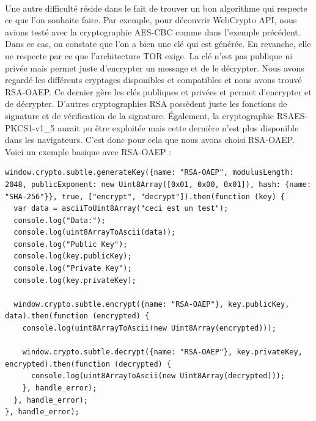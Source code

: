 \documentclass[a4paper,12pt]{report}
\begin{document}
	\paragraph*{}
	Une autre difficulté réside dans le fait de trouver un bon algorithme qui respecte ce que l'on souhaite faire. Par exemple, pour découvrir WebCrypto API, nous avions testé avec la cryptographie AES-CBC comme dans l'exemple précédent.
	Dans ce cas, on constate que l'on a bien une clé qui est générée. En revanche, elle ne respecte par ce que l'architecture TOR exige. La clé n'est pas publique ni privée mais permet juste d'encrypter un message et de le décrypter. Nous avons regardé les différents cryptages disponibles et compatibles et nous avons trouvé RSA-OAEP. Ce dernier gère les clés publiques et privées et permet d'encrypter et de décrypter. D'autres cryptographies RSA possèdent juste les fonctions de signature et de vérification de la signature. Également, la cryptographie RSAES-PKCS1-v1\_5	 aurait pu être exploitée mais cette dernière n'est plus disponible dans les navigateurs. C'est donc pour cela que nous avons choisi RSA-OAEP.\\
	Voici un exemple basique avec RSA-OAEP :
	\begin{lstlisting}
window.crypto.subtle.generateKey({name: "RSA-OAEP", modulusLength: 2048, publicExponent: new Uint8Array([0x01, 0x00, 0x01]), hash: {name: "SHA-256"}}, true, ["encrypt", "decrypt"]).then(function (key) {
  var data = asciiToUint8Array("ceci est un test");
  console.log("Data:");
  console.log(uint8ArrayToAscii(data));
  console.log("Public Key");
  console.log(key.publicKey);
  console.log("Private Key");
  console.log(key.privateKey);

  window.crypto.subtle.encrypt({name: "RSA-OAEP"}, key.publicKey, data).then(function (encrypted) {
    console.log(uint8ArrayToAscii(new Uint8Array(encrypted)));

    window.crypto.subtle.decrypt({name: "RSA-OAEP"}, key.privateKey, encrypted).then(function (decrypted) {
      console.log(uint8ArrayToAscii(new Uint8Array(decrypted)));
    }, handle_error);
  }, handle_error);
}, handle_error);
	\end{lstlisting}
\end{document}
